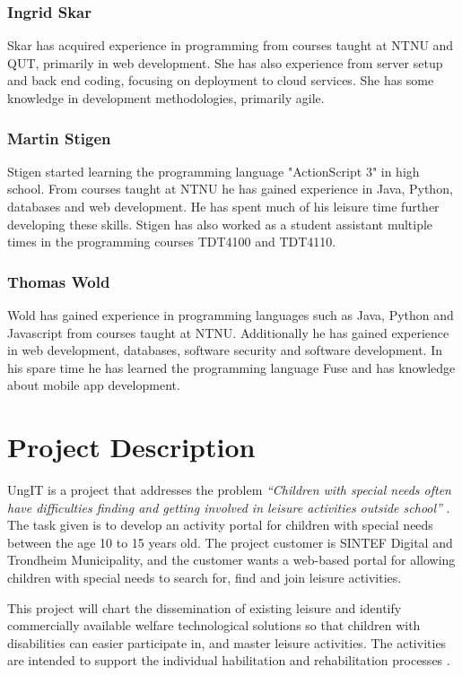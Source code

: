 \subsubsection{Ingrid Skar}
Skar has acquired experience in programming from courses taught at NTNU and QUT, primarily in web development. She has also experience from server setup and back end coding, focusing on deployment to cloud services. She has some knowledge in development methodologies, primarily agile. 

\subsubsection{Martin Stigen}
Stigen started learning the programming language "ActionScript 3" in high school. From courses taught at NTNU he has gained experience in Java, Python, databases and web development. He has spent much of his leisure time further developing these skills. Stigen has also worked as a student assistant multiple times in the programming courses TDT4100 and TDT4110.

\subsubsection{Thomas Wold}
Wold has gained experience in programming languages such as Java, Python and Javascript from courses taught at NTNU. Additionally he has gained experience in web development, databases, software security and software development. In his spare time he has learned the programming language Fuse and has knowledge about mobile app development.


\section{Project Description}
UngIT is a project that addresses the problem \textit{“Children with special needs often have difficulties finding and getting involved in leisure activities outside school”} \cite{SintefBachelorProjectDescription}. The task given is to develop an activity portal for children with special needs between the age 10 to 15 years old. The project customer is SINTEF Digital and Trondheim Municipality, and the customer wants a web-based portal for allowing children with special needs to search for, find and join leisure activities.

This project will chart the dissemination of existing leisure and identify commercially available welfare technological solutions so that children with disabilities can easier participate in, and master leisure activities. The activities are intended to support the individual habilitation and rehabilitation processes \cite{SintefOnlineProjectDescription}.

